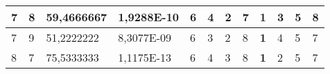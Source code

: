 \documentclass[conference]{IEEEtran}
\begin{document}
\begin{table*}[]
\begin{tabular}{|llll|llllllll|}
\multicolumn{1}{|l|}{7}                                                     & \multicolumn{1}{l|}{8}                                                        & \multicolumn{1}{l|}{59,4666667}                                                   & 1,9288E-10                     & \multicolumn{1}{l|}{6}                                                  & \multicolumn{1}{l|}{4}                                                  & \multicolumn{1}{l|}{2}                                                  & \multicolumn{1}{l|}{7}                                                  & \multicolumn{1}{l|}{\textbf{1}}                                         & \multicolumn{1}{l|}{3}                                                  & \multicolumn{1}{l|}{5}                                                  & 8                          \\ \hline
\multicolumn{1}{|l|}{7}                                                     & \multicolumn{1}{l|}{9}                                                        & \multicolumn{1}{l|}{51,2222222}                                                   & 8,3077E-09                     & \multicolumn{1}{l|}{6}                                                  & \multicolumn{1}{l|}{3}                                                  & \multicolumn{1}{l|}{2}                                                  & \multicolumn{1}{l|}{8}                                                  & \multicolumn{1}{l|}{\textbf{1}}                                         & \multicolumn{1}{l|}{4}                                                  & \multicolumn{1}{l|}{5}                                                  & 7                          \\ \hline
\multicolumn{1}{|l|}{8}                                                     & \multicolumn{1}{l|}{7}                                                        & \multicolumn{1}{l|}{75,5333333}                                                   & 1,1175E-13                     & \multicolumn{1}{l|}{6}                                                  & \multicolumn{1}{l|}{4}                                                  & \multicolumn{1}{l|}{3}                                                  & \multicolumn{1}{l|}{8}                                                  & \multicolumn{1}{l|}{\textbf{1}}                                         & \multicolumn{1}{l|}{2}                                                  & \multicolumn{1}{l|}{5}                                                  & 7                          \\ \hline

\end{tabular}
\end{table*}
\end{document}
